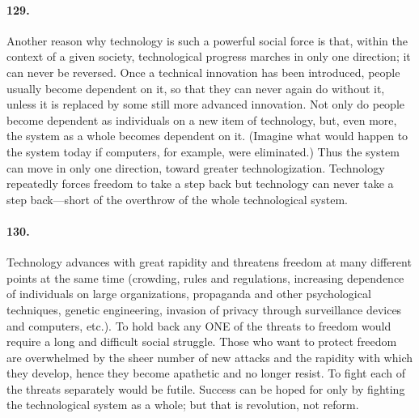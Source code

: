 \documentclass[12pt]{book}
\begin{document}
\paragraph{129.}  Another reason why technology is such a powerful social force is that, within the context of a given society, technological progress marches in only one direction; it can never be reversed. Once a technical innovation has been introduced, people usually become dependent on it, so that they can never again do without it, unless it is replaced by some still more advanced innovation. Not only do people become dependent as individuals on a new item of technology, but, even more, the system as a whole becomes dependent on it. (Imagine what would happen to the system today if computers, for example, were eliminated.) Thus the system can move in only one direction, toward greater technologization. Technology repeatedly forces freedom to take a step back but technology can never take a step back---short of the overthrow of the whole technological system.


\paragraph{130.}  Technology advances with great rapidity and threatens freedom at many different points at the same time (crowding, rules and regulations, increasing dependence of individuals on large organizations, propaganda and other psychological techniques, genetic engineering, invasion of privacy through surveillance devices and computers, etc.). To hold back any ONE of the threats to freedom would require a long and difficult social struggle.  Those who want to protect freedom are overwhelmed by the sheer number of new attacks and the rapidity with which they develop, hence they become apathetic and no longer resist. To fight each of the threats separately would be futile. Success can be hoped for only by fighting the technological system as a whole; but that is revolution, not reform.
\end{document}
